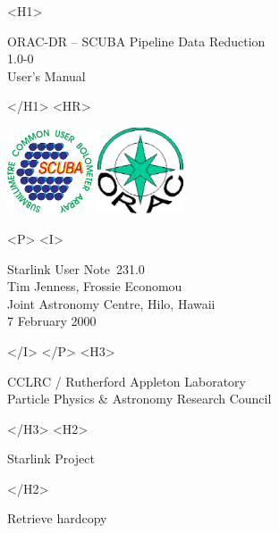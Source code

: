 \documentclass[twoside,11pt]{article}
\newcommand{\stardoccategory}  {Starlink User Note}
\newcommand{\stardocsource}    {sun\stardocnumber}
\newcommand{\stardocnumber}    {231.0}
\newcommand{\stardocauthors}   {Tim Jenness, Frossie Economou\\
Joint Astronomy Centre, Hilo, Hawaii}
\newcommand{\stardocdate}      {7 February 2000}
\newcommand{\stardoctitle}     {ORAC-DR -- SCUBA Pipeline Data Reduction}
\newcommand{\stardocversion}   {1.0-0}
\newcommand{\stardocmanual}    {User's Manual}
\newcommand{\htmladdnormallink}[2]{#1}
\newcommand{\htmladdimg}[1]{}
\newcommand{\xlabel}[1]{}
\renewcommand{\_}{\texttt{\symbol{95}}}
\begin{document}
\begin{htmlonly}
   \xlabel{}
   \begin{rawhtml} <H1> \end{rawhtml}
      \stardoctitle\\
      \stardocversion\\
      \stardocmanual
   \begin{rawhtml} </H1> <HR> \end{rawhtml}

\includegraphics[width=1.0in]{sun231_sculogo.eps}
\includegraphics[width=1.0in]{sun231_logo.eps}

   \begin{rawhtml} <P> <I> \end{rawhtml}
   \stardoccategory\ \stardocnumber \\
   \stardocauthors \\
   \stardocdate
   \begin{rawhtml} </I> </P> <H3> \end{rawhtml}
      \htmladdnormallink{CCLRC / Rutherford Appleton Laboratory}
                        {http://www.cclrc.ac.uk} \\
      \htmladdnormallink{Particle Physics \& Astronomy Research Council}
                        {http://www.pparc.ac.uk} \\
   \begin{rawhtml} </H3> <H2> \end{rawhtml}
      \htmladdnormallink{Starlink Project}{http://www.starlink.rl.ac.uk/}
   \begin{rawhtml} </H2> \end{rawhtml}
   \htmladdnormallink{\htmladdimg{source.gif} Retrieve hardcopy}
      {http://www.starlink.rl.ac.uk/cgi-bin/hcserver?\stardocsource}\\


\end{htmlonly}
\end{document}
